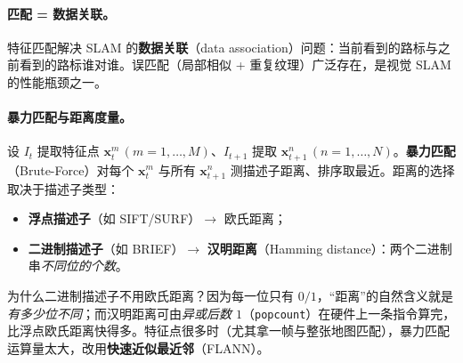 \paragraph{匹配 = 数据关联\cite{gaoxiang2019slam14}。}特征匹配解决 SLAM 的\textbf{数据关联}（data association）问题：当前看到的路标与之前看到的路标谁对谁。误匹配（局部相似 + 重复纹理）广泛存在，是视觉 SLAM 的性能瓶颈之一。

\paragraph{暴力匹配与距离度量。}设 $I_t$ 提取特征点 $\mathbf{x}_t^m\,(m=1,\dots,M)$、$I_{t+1}$ 提取 $\mathbf{x}_{t+1}^n\,(n=1,\dots,N)$。\textbf{暴力匹配}（Brute-Force）对每个 $\mathbf{x}_t^m$ 与所有 $\mathbf{x}_{t+1}^n$ 测描述子距离、排序取最近。距离的选择取决于描述子类型：
\begin{itemize}
  \item \textbf{浮点描述子}（如 SIFT/SURF）$\to$ 欧氏距离；
  \item \textbf{二进制描述子}（如 BRIEF）$\to$ \textbf{汉明距离}（Hamming distance）：两个二进制串\emph{不同位的个数}。
\end{itemize}
为什么二进制描述子不用欧氏距离？因为每一位只有 $0/1$，“距离”的自然含义就是\emph{有多少位不同}；而汉明距离可由\emph{异或后数 $1$}（\texttt{popcount}）在硬件上一条指令算完，比浮点欧氏距离快得多。特征点很多时（尤其拿一帧与整张地图匹配），暴力匹配运算量太大，改用\textbf{快速近似最近邻}（FLANN）。

